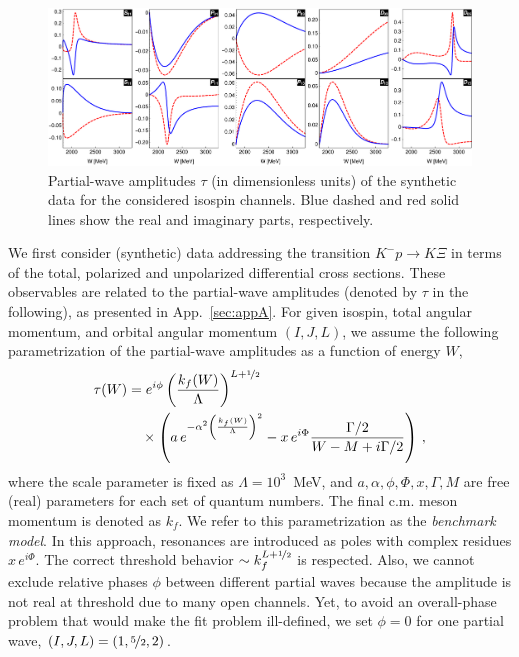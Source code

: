\documentclass[10pt,aps,prc,superscriptaddress,twoside,twocolumn,nofootinbib,showpacs,preprintnumbers]{revtex4-1}
\begin{document}
\begin{figure}[t]
\begin{center}
\includegraphics[width=0.99\linewidth, trim=0cm 0.5cm 0cm 0cm]{f1-horizontal.pdf}
\end{center}
\caption{%
 Partial-wave amplitudes $\tau$ (in dimensionless units) of the synthetic data for the considered isospin channels. Blue dashed and red solid lines show the real and imaginary parts, respectively.
}
\label{fig:PWA-synthetic}
\end{figure}

We first consider (synthetic) data addressing the transition $K^-p\to K\Xi$ in terms of the total, polarized and unpolarized differential cross sections. These observables are related to the partial-wave amplitudes (denoted by $\tau$ in the following), as presented in App.~\ref{sec:appA}. For given isospin, total angular momentum, and orbital angular momentum $(I,J,L)$, we assume the following parametrization of the partial-wave amplitudes as a function of energy $W$,
\begin{align}
\label{tau}
\tau(W)&=
e^{i \phi}
 \left(\frac{k_f(W)}{\Lambda} \right)^{L+\nicefrac{1}{2}}\\
&
\mbox{}\quad\times\left(
a\,e^{-\alpha^2 \left(\frac{k_f(W)}{\Lambda}\right)^2} -x\,e^{i\Phi} \frac{\Gamma/2}{W-M+i \Gamma/2} 
\right)\,,
\nonumber
\end{align}
where the scale parameter is fixed as $\Lambda=10^3$~MeV, and $a,\alpha, \phi,\Phi,x, \Gamma,M$ are free (real) parameters for each set of quantum numbers. The final c.m. meson momentum is denoted as $k_f$. We refer to this parametrization as the \emph{benchmark model}. 
In this approach, resonances are introduced as poles with complex residues $x\,e^{i\Phi}$. The correct threshold behavior $\sim k_f^{L+\nicefrac{1}{2}}$ is respected. Also, we cannot exclude relative phases $\phi$ between different partial waves because the amplitude is not real at threshold due to many open channels. Yet, to avoid an overall-phase problem that would make the fit problem ill-defined, we set $\phi=0$ for one partial wave, $(I,J,L)=(1,\nicefrac{5}{2},2)$. 
\end{document}
